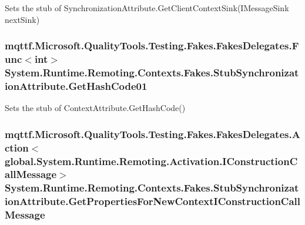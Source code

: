 Sets the stub of Synchronization\-Attribute.\-Get\-Client\-Context\-Sink(\-I\-Message\-Sink next\-Sink)

\hypertarget{class_system_1_1_runtime_1_1_remoting_1_1_contexts_1_1_fakes_1_1_stub_synchronization_attribute_ade03b010967e2d0137cdd4aeb3403335}{
\subsubsection[{Get\-Hash\-Code01}]{\setlength{\rightskip}{0pt plus 5cm}mqttf.\-Microsoft.\-Quality\-Tools.\-Testing.\-Fakes.\-Fakes\-Delegates.\-Func$<$int$>$ System.\-Runtime.\-Remoting.\-Contexts.\-Fakes.\-Stub\-Synchronization\-Attribute.\-Get\-Hash\-Code01}}\label{class_system_1_1_runtime_1_1_remoting_1_1_contexts_1_1_fakes_1_1_stub_synchronization_attribute_ade03b010967e2d0137cdd4aeb3403335}


Sets the stub of Context\-Attribute.\-Get\-Hash\-Code()

\hypertarget{class_system_1_1_runtime_1_1_remoting_1_1_contexts_1_1_fakes_1_1_stub_synchronization_attribute_a312c022d83c0be57951c69f565500279}{
\subsubsection[{Get\-Properties\-For\-New\-Context\-I\-Construction\-Call\-Message}]{\setlength{\rightskip}{0pt plus 5cm}mqttf.\-Microsoft.\-Quality\-Tools.\-Testing.\-Fakes.\-Fakes\-Delegates.\-Action$<$global.\-System.\-Runtime.\-Remoting.\-Activation.\-I\-Construction\-Call\-Message$>$ System.\-Runtime.\-Remoting.\-Contexts.\-Fakes.\-Stub\-Synchronization\-Attribute.\-Get\-Properties\-For\-New\-Context\-I\-Construction\-Call\-Message}}\label{class_system_1_1_runtime_1_1_remoting_1_1_contexts_1_1_fakes_1_1_stub_synchronization_attribute_a312c022d83c0be57951c69f565500279}



